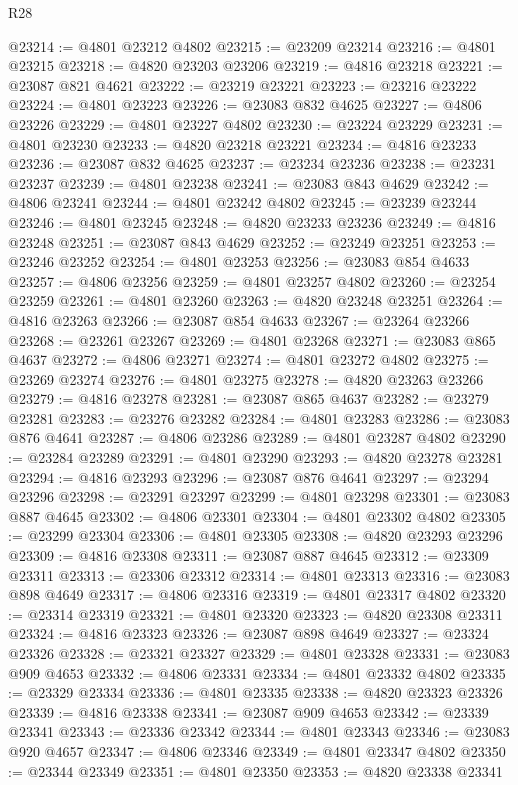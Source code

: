 \begin{lexlean}{R28}
\begin{coremodule}
@23214 := @4801 @23212 @4802
@23215 := @23209 @23214
@23216 := @4801 @23215
@23218 := @4820 @23203 @23206
@23219 := @4816 @23218
@23221 := @23087 @821 @4621
@23222 := @23219 @23221
@23223 := @23216 @23222
@23224 := @4801 @23223
@23226 := @23083 @832 @4625
@23227 := @4806 @23226
@23229 := @4801 @23227 @4802
@23230 := @23224 @23229
@23231 := @4801 @23230
@23233 := @4820 @23218 @23221
@23234 := @4816 @23233
@23236 := @23087 @832 @4625
@23237 := @23234 @23236
@23238 := @23231 @23237
@23239 := @4801 @23238
@23241 := @23083 @843 @4629
@23242 := @4806 @23241
@23244 := @4801 @23242 @4802
@23245 := @23239 @23244
@23246 := @4801 @23245
@23248 := @4820 @23233 @23236
@23249 := @4816 @23248
@23251 := @23087 @843 @4629
@23252 := @23249 @23251
@23253 := @23246 @23252
@23254 := @4801 @23253
@23256 := @23083 @854 @4633
@23257 := @4806 @23256
@23259 := @4801 @23257 @4802
@23260 := @23254 @23259
@23261 := @4801 @23260
@23263 := @4820 @23248 @23251
@23264 := @4816 @23263
@23266 := @23087 @854 @4633
@23267 := @23264 @23266
@23268 := @23261 @23267
@23269 := @4801 @23268
@23271 := @23083 @865 @4637
@23272 := @4806 @23271
@23274 := @4801 @23272 @4802
@23275 := @23269 @23274
@23276 := @4801 @23275
@23278 := @4820 @23263 @23266
@23279 := @4816 @23278
@23281 := @23087 @865 @4637
@23282 := @23279 @23281
@23283 := @23276 @23282
@23284 := @4801 @23283
@23286 := @23083 @876 @4641
@23287 := @4806 @23286
@23289 := @4801 @23287 @4802
@23290 := @23284 @23289
@23291 := @4801 @23290
@23293 := @4820 @23278 @23281
@23294 := @4816 @23293
@23296 := @23087 @876 @4641
@23297 := @23294 @23296
@23298 := @23291 @23297
@23299 := @4801 @23298
@23301 := @23083 @887 @4645
@23302 := @4806 @23301
@23304 := @4801 @23302 @4802
@23305 := @23299 @23304
@23306 := @4801 @23305
@23308 := @4820 @23293 @23296
@23309 := @4816 @23308
@23311 := @23087 @887 @4645
@23312 := @23309 @23311
@23313 := @23306 @23312
@23314 := @4801 @23313
@23316 := @23083 @898 @4649
@23317 := @4806 @23316
@23319 := @4801 @23317 @4802
@23320 := @23314 @23319
@23321 := @4801 @23320
@23323 := @4820 @23308 @23311
@23324 := @4816 @23323
@23326 := @23087 @898 @4649
@23327 := @23324 @23326
@23328 := @23321 @23327
@23329 := @4801 @23328
@23331 := @23083 @909 @4653
@23332 := @4806 @23331
@23334 := @4801 @23332 @4802
@23335 := @23329 @23334
@23336 := @4801 @23335
@23338 := @4820 @23323 @23326
@23339 := @4816 @23338
@23341 := @23087 @909 @4653
@23342 := @23339 @23341
@23343 := @23336 @23342
@23344 := @4801 @23343
@23346 := @23083 @920 @4657
@23347 := @4806 @23346
@23349 := @4801 @23347 @4802
@23350 := @23344 @23349
@23351 := @4801 @23350
@23353 := @4820 @23338 @23341

\end{coremodule}
\end{lexlean}
